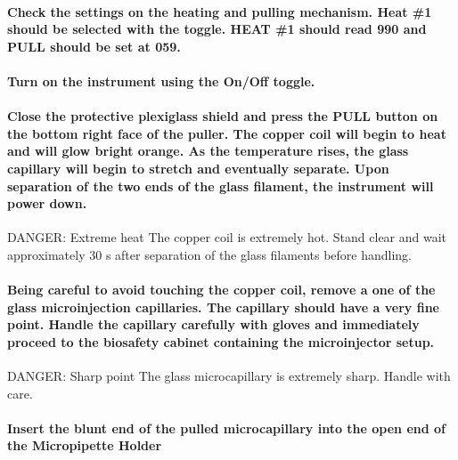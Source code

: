 \documentclass[11pt]{article}
\newcommand\dangersign[1][4ex]{\renewcommand\stacktype{L}\scaleto{\stackon[1pt]{\color{red}$\triangle$}{\tiny !}}{#1}}
\begin{document}
\paragraph{{\sffamily } Check the settings on the heating and pulling mechanism. Heat \#1 should be selected with the toggle. HEAT \#1 should read 990 and PULL should be set at 059.}
\label{sec:orgheadline26}
\paragraph{{\sffamily } Turn on the instrument using the On/Off toggle.}
\label{sec:orgheadline27}
\paragraph{{\sffamily } Close the protective plexiglass shield and press the PULL button on the bottom right face of the puller. The copper coil will begin to heat and will glow bright orange. As the temperature rises, the glass capillary will begin to stretch and eventually separate. Upon separation of the two ends of the glass filament, the instrument will power down.\\}
\label{sec:orgheadline28}
\begin{bclogo}[logo=\dangersign, couleurBarre=red, noborder=true, couleur=yellow!20]{     DANGER: Extreme heat}
The copper coil is extremely hot. Stand clear and wait approximately 30 s after separation of the glass filaments before handling.\\
\end{bclogo}
\paragraph{{\sffamily } Being careful to avoid touching the copper coil, remove a one of the glass microinjection capillaries. The capillary should have a very fine point. Handle the capillary carefully with gloves and immediately proceed to the biosafety cabinet containing the microinjector setup. \\}
\label{sec:orgheadline29}
\begin{bclogo}[logo=\dangersign, couleurBarre=red, noborder=true, couleur=yellow!20]{     DANGER: Sharp point}
The glass microcapillary is extremely sharp. Handle with care.\\
\end{bclogo}
\paragraph{{\sffamily } Insert the blunt end of the pulled microcapillary into the open end of the Micropipette Holder}
\label{sec:orgheadline30}
\end{document}
